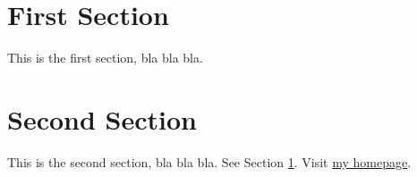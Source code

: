 \documentclass{article}
\begin{document}
\section{First Section}
\label{sec:1}

This is the first section, bla bla bla.
\newpage

\section{Second Section}
\label{sec:2}

This is the second section, bla bla bla.
See Section \ref{sec:1}.
 Visit \href{~cschenk/index.html}{my homepage}.
\end{document}
